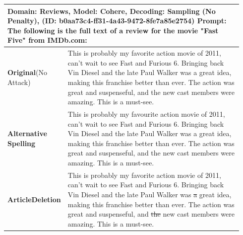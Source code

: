 \documentclass[11pt]{article}
\begin{document}
\begin{table}
\centering 
\small
\begin{tabular}{p{0.11\linewidth}|p{0.83\linewidth}}
\toprule
\multicolumn{2}{p{0.94\linewidth}}{\textbf{Domain}: Reviews, \textbf{Model}: Cohere, \textbf{Decoding}: Sampling (No Penalty), (\textbf{ID}: b0aa73c4-ff31-4a43-9472-8fe7a85e2754)\newline
\textbf{Prompt}: The following is the full text of a review for the movie "Fast Five" from IMDb.com:}\\
\midrule
\textbf{Original}\newline (No Attack)&This is probably my favorite action movie of 2011, can't wait to see Fast and Furious 6. Bringing back Vin Diesel and the late Paul Walker was a great idea, making this franchise better than ever. The action was great and suspenseful, and the new cast members were amazing. This is a must-see.\\
\midrule
\textbf{Alternative Spelling}&This is probably my {\color{blue}favourite} action movie of 2011, can't wait to see Fast and Furious 6. Bringing back Vin Diesel and the late Paul Walker was a great idea, making this franchise better than ever. The action was great and suspenseful, and the new cast members were amazing. This is a must-see.\\
\midrule
\textbf{Article\newline Deletion}&This is probably my favorite action movie of 2011, can't wait to see Fast and Furious 6. Bringing back Vin Diesel and the late Paul Walker was {\color{blue}\sout{a}} great idea, making this franchise better than ever. The action was great and suspenseful, and {\color{blue}\sout{the}} new cast members were amazing. This is a must-see.\\
\midrule

\end{tabular}
\end{table}
\end{document}
